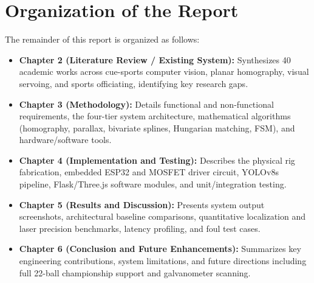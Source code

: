\section{Organization of the Report}
The remainder of this report is organized as follows:
\begin{itemize}
    \item \textbf{Chapter 2 (Literature Review / Existing System):} Synthesizes 40 academic works across cue-sports computer vision, planar homography, visual servoing, and sports officiating, identifying key research gaps.
    \item \textbf{Chapter 3 (Methodology):} Details functional and non-functional requirements, the four-tier system architecture, mathematical algorithms (homography, parallax, bivariate splines, Hungarian matching, FSM), and hardware/software tools.
    \item \textbf{Chapter 4 (Implementation and Testing):} Describes the physical rig fabrication, embedded ESP32 and MOSFET driver circuit, YOLOv8s pipeline, Flask/Three.js software modules, and unit/integration testing.
    \item \textbf{Chapter 5 (Results and Discussion):} Presents system output screenshots, architectural baseline comparisons, quantitative localization and laser precision benchmarks, latency profiling, and foul test cases.
    \item \textbf{Chapter 6 (Conclusion and Future Enhancements):} Summarizes key engineering contributions, system limitations, and future directions including full 22-ball championship support and galvanometer scanning.
\end{itemize}
